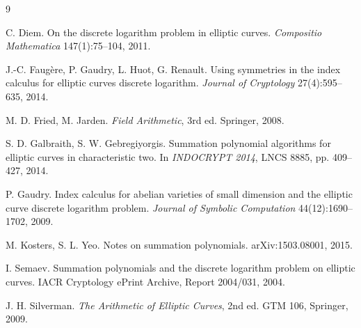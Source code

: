 \documentclass[11pt,a4paper]{article}
\theoremstyle{plain}
\theoremstyle{definition}
\begin{document}
\begin{thebibliography}{9}

C. Diem.
\newblock On the discrete logarithm problem in elliptic curves.
\newblock \emph{Compositio Mathematica} 147(1):75--104, 2011.

J.-C. Faugère, P. Gaudry, L. Huot, G. Renault.
\newblock Using symmetries in the index calculus for elliptic curves discrete
  logarithm.
\newblock \emph{Journal of Cryptology} 27(4):595--635, 2014.

M. D. Fried, M. Jarden.
\newblock \emph{Field Arithmetic}, 3rd ed.
\newblock Springer, 2008.

S. D. Galbraith, S. W. Gebregiyorgis.
\newblock Summation polynomial algorithms for elliptic curves in characteristic
  two.
\newblock In \emph{INDOCRYPT 2014}, LNCS 8885, pp. 409--427, 2014.

P. Gaudry.
\newblock Index calculus for abelian varieties of small dimension and the
  elliptic curve discrete logarithm problem.
\newblock \emph{Journal of Symbolic Computation} 44(12):1690--1702, 2009.

M. Kosters, S. L. Yeo.
\newblock Notes on summation polynomials.
\newblock arXiv:1503.08001, 2015.

I. Semaev.
\newblock Summation polynomials and the discrete logarithm problem on elliptic
  curves.
\newblock IACR Cryptology ePrint Archive, Report 2004/031, 2004.

J. H. Silverman.
\newblock \emph{The Arithmetic of Elliptic Curves}, 2nd ed.
\newblock GTM 106, Springer, 2009.

\end{thebibliography}
\end{document}
